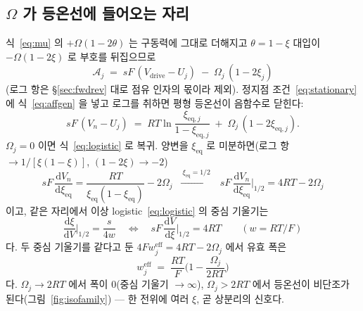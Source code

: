 \documentclass[11pt,a4paper]{article}
\newcommand{\dd}{\mathrm{d}}
\newcommand{\eff}{\mathrm{eff}}
\newcommand{\eq}{\mathrm{eq}}
\newcommand{\drive}{\mathrm{drive}}
\begin{document}
\subsection{$\Omega$ 가 등온선에 들어오는 자리}
식~\eqref{eq:mu} 의 $+\Omega(1-2\theta)$ 는 구동력에 그대로 더해지고 $\theta=1-\xi$ 대입이 $-\Omega(1-2\xi)$ 로 부호를 뒤집으므로
\begin{equation}
\mathcal A_j\;=\;sF\,(V_\drive-U_j)\;-\;\Omega_j\,(1-2\xi_j)
\label{eq:affgen}
\end{equation}
(로그 항은 \S\ref{sec:fwdrev} 대로 점유 인자의 몫이라 제외). 정지점 조건~\eqref{eq:stationary} 에 식~\eqref{eq:affgen} 을 넣고 로그를 취하면 평형 등온선이 음함수로 닫힌다:
\begin{equation}
sF\,(V_n-U_j)\;=\;RT\ln\frac{\xi_{\eq,j}}{1-\xi_{\eq,j}}\;+\;\Omega_j\,(1-2\xi_{\eq,j}).
\label{eq:isotherm}
\end{equation}
$\Omega_j=0$ 이면 식~\eqref{eq:logistic} 로 복귀. 양변을 $\xi_{\eq}$ 로 미분하면(로그 항 $\to1/[\xi(1-\xi)]$, $(1-2\xi)\to-2$)
\begin{equation}
sF\,\frac{\dd V_n}{\dd\xi_{\eq}}
=\frac{RT}{\xi_{\eq}(1-\xi_{\eq})}-2\Omega_j
\;\;\xrightarrow{\ \xi_{\eq}=1/2\ }\;\;
sF\,\frac{\dd V_n}{\dd\xi_{\eq}}\Big|_{1/2}=4RT-2\Omega_j
\label{eq:isoslope}
\end{equation}
이고, 같은 자리에서 이상 logistic~\eqref{eq:logistic} 의 중심 기울기는
\begin{equation}
\frac{\dd\xi}{\dd V}\Big|_{1/2}=\frac{s}{4w}
\quad\Longleftrightarrow\quad
sF\,\frac{\dd V}{\dd\xi}\Big|_{1/2}=4RT
\qquad(w=RT/F)
\label{eq:logslope}
\end{equation}
다. 두 중심 기울기를 같다고 둔 $4Fw_j^{\eff}=4RT-2\Omega_j$ 에서 유효 폭은
\begin{equation}
w_j^{\eff}\;=\;\frac{RT}{F}\Big(1-\frac{\Omega_j}{2RT}\Big)
\label{eq:weff}
\end{equation}
다. $\Omega_j\to2RT$ 에서 폭이 $0$(중심 기울기 $\to\infty$), $\Omega_j>2RT$ 에서 등온선이 비단조가 된다(그림~\ref{fig:isofamily}) — 한 전위에 여러 $\xi$, 곧 상분리의 신호다.
\end{document}
